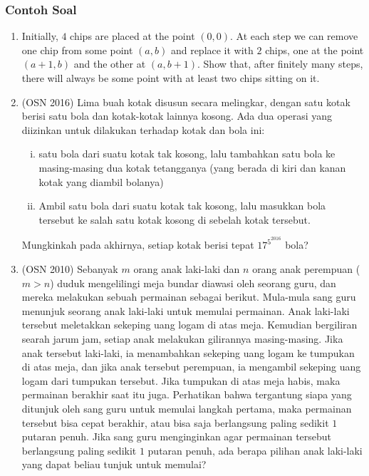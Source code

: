 \documentclass[12pt]{scrartcl}
\begin{document}
\subsubsection{Contoh Soal}
\begin{enumerate}
    \item Initially, $4$ chips are placed at the point $(0, 0)$. At each step we can remove one chip from some point $(a, b)$ and replace it with $2$ chips, one at the point $(a + 1, b)$ and the other at $(a, b + 1)$. Show that, after finitely many steps, there will always be some point with at least two chips sitting on it.
    \item (OSN 2016) Lima buah kotak disusun secara melingkar, dengan satu kotak berisi satu bola dan kotak-kotak lainnya kosong. Ada dua operasi yang diizinkan untuk dilakukan terhadap kotak dan bola ini:
    \begin{enumerate}[(i)]
        \item  satu bola dari suatu kotak tak kosong, lalu tambahkan satu bola ke masing-masing dua kotak tetangganya (yang berada di kiri dan kanan kotak yang diambil bolanya)
        \item Ambil satu bola dari suatu kotak tak kosong, lalu masukkan bola tersebut ke salah satu kotak kosong di sebelah kotak tersebut.
    \end{enumerate}
    Mungkinkah pada akhirnya, setiap kotak berisi tepat $17^{5^{2016}}$ bola?

    \item (OSN 2010) Sebanyak $m$ orang anak laki-laki dan $n$ orang anak perempuan ($m > n$) duduk mengelilingi meja bundar diawasi oleh seorang guru, dan mereka melakukan sebuah permainan sebagai berikut. Mula-mula sang guru menunjuk seorang anak laki-laki untuk memulai permainan. Anak laki-laki tersebut meletakkan sekeping uang logam di atas meja. Kemudian bergiliran searah jarum jam, setiap anak melakukan gilirannya masing-masing. Jika anak tersebut laki-laki, ia menambahkan sekeping uang logam ke tumpukan di atas meja, dan jika anak tersebut perempuan, ia mengambil sekeping uang logam dari tumpukan tersebut. Jika tumpukan di atas meja habis, maka permainan berakhir saat itu juga. Perhatikan bahwa tergantung siapa yang ditunjuk oleh sang guru untuk memulai langkah pertama, maka permainan tersebut bisa cepat berakhir, atau bisa saja berlangsung paling sedikit $1$ putaran penuh.
    Jika sang guru menginginkan agar permainan tersebut berlangsung paling sedikit $1$ putaran penuh, ada berapa pilihan anak laki-laki yang dapat beliau tunjuk untuk memulai?
\end{enumerate}
\end{document}
